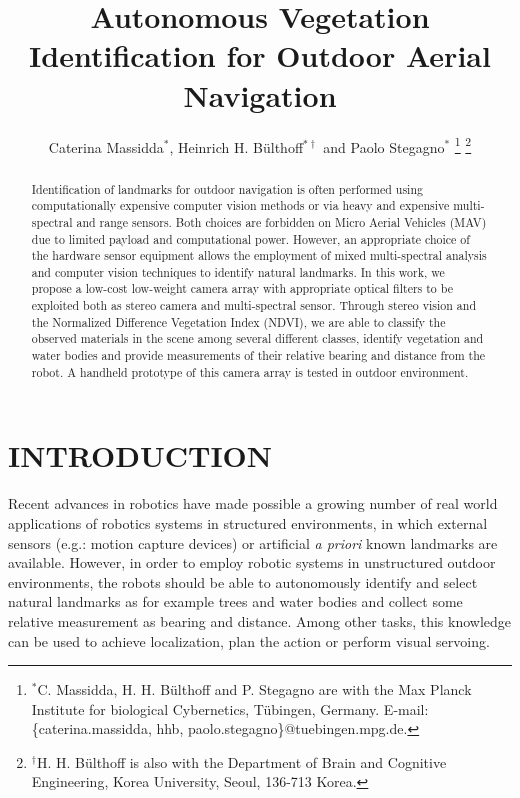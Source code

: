 \documentclass[letterpaper, 10pt, conference]{ieeeconf}      %
\title{\LARGE \bf
Autonomous Vegetation Identification for Outdoor Aerial Navigation
}
\author{
Caterina Massidda$^{*}$,
Heinrich H. B{\"u}lthoff$^{*\dag}$
and Paolo Stegagno$^{*}$%
\thanks{$^{*}$C. Massidda, H. H. B{\"u}lthoff and P. Stegagno are with the Max Planck Institute for biological Cybernetics, T{\"u}bingen, Germany. E-mail: \{caterina.massidda, hhb, paolo.stegagno\}@tuebingen.mpg.de.}%
\thanks{$^{\dag}$H. H. B{\"u}lthoff is also with the Department of Brain and Cognitive Engineering, Korea University, Seoul, 136-713 Korea.}%
}
\begin{document}
\maketitle
\thispagestyle{empty}
\pagestyle{empty}

\begin{abstract}
Identification of landmarks for outdoor navigation is often performed using computationally expensive computer vision methods or via heavy and expensive multi-spectral and range sensors. Both choices are forbidden on Micro Aerial Vehicles (MAV) due to limited payload and computational power. However, an appropriate choice of the hardware sensor equipment allows the employment of mixed multi-spectral analysis and computer vision techniques to identify natural landmarks. In this work, we propose a low-cost low-weight camera array with appropriate optical filters to be exploited both as stereo camera and multi-spectral sensor.
Through stereo vision and the Normalized Difference Vegetation Index (NDVI), we are able to classify the observed materials in the scene among several different classes, identify vegetation and water bodies and provide measurements of their relative bearing and distance from the robot.
A handheld prototype of this camera array is tested in outdoor environment.
\end{abstract}


\section{INTRODUCTION}\label{sec:introduction}

Recent advances in robotics have made possible a growing number of  real world applications of robotics systems in structured environments, in which external sensors (e.g.: motion capture devices) or artificial {\it a priori} known landmarks are available.
However, in order to employ robotic systems in unstructured outdoor environments, the robots should be able to autonomously identify and select natural landmarks as for example trees and water bodies and collect some relative measurement as bearing and distance.
Among other tasks, this knowledge can be used to achieve localization, plan the action or perform visual servoing.
\end{document}
